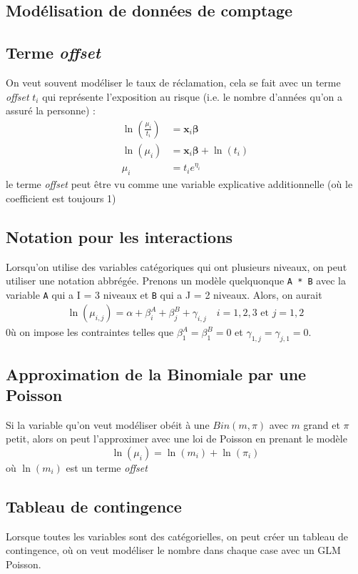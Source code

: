 \documentclass[10pt, french]{article}
\begin{document}
\begin{multicols*}{3}
\section{Modélisation de données de comptage}

\subsection*{Terme \emph{offset}}
On veut souvent modéliser le taux  de réclamation, cela se fait avec un terme \emph{offset} $t_i$ qui représente l'exposition au risque (i.e. le nombre d'années qu'on a assuré la personne) : 
\begin{align*}
\ln \left( \frac{\mu_i}{t_i} \right) & = \bm{x}_i \bm{\beta} \\
\ln (\mu_i) & = \bm{x}_i \bm{\beta} + \ln (t_i) \\
\mu_i & = t_i e^{\eta_i}
\end{align*}
le terme \emph{offset} peut être vu comme une variable explicative additionnelle (où le coefficient est toujours 1)

\subsection*{Notation pour les interactions}
Lorsqu'on utilise des variables catégoriques qui ont plusieurs niveaux, on peut utiliser une notation abbrégée. Prenons un modèle quelquonque \verb=A * B= avec la variable \verb=A= qui a I = 3 niveaux et \verb=B= qui a J = 2 niveaux. Alors, on aurait
\begin{align*}
\ln (\mu_{i,j}) = \alpha + \beta_i^A + \beta_j^B + \gamma_{i,j} \quad i = 1,2,3 \text{ et } j = 1,2
\end{align*}
0ù on impose les contraintes telles que $\beta_1^A = \beta_1^B = 0$ et $\gamma_{1,j} = \gamma_{j,1} = 0$. 

\subsection*{Approximation de la Binomiale par une Poisson}
Si la variable qu'on veut modéliser obéit à une $Bin(m, \pi)$ avec $m$ grand et $\pi$ petit, alors on peut l'approximer avec une loi de Poisson en prenant le modèle
\[\ln(\mu_i) = \ln(m_i) + \ln(\pi_i) \]
où $\ln(m_i)$ est un terme \emph{offset}

\subsection*{Tableau de contingence}
Lorsque toutes les variables sont des catégorielles, on peut créer un tableau de contingence, où on veut modéliser le nombre dans chaque case avec un GLM Poisson. \\


\end{multicols*}
\end{document}
